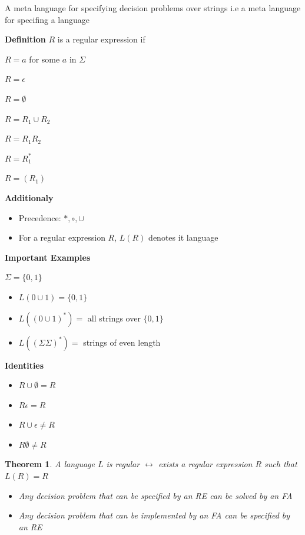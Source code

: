 \documentclass[oneside, 12pt]{book}
\newtheorem{theorem}{Theorem}
\begin{document}
A meta language for specifying decision problems over strings
i.e a meta language for specifing a language

\textbf{Definition} $R$ is a regular expression if

$R = a$ for some $a$ in $\Sigma$

$R=\epsilon$

$R=\emptyset$

$R = R_{1}\cup R_{2}$

$R = R_{1}R_{2}$

$R = R_{1}^{*}$

$R = (R_{1})$

\textbf{Additionaly}
\begin{itemize}
  \item Precedence: $*, \circ, \cup$
  \item For a regular expression $R$, $L(R)$ denotes it language
\end{itemize}

\textbf{Important Examples}

$\Sigma = \{0,1\}$

\begin{itemize}
  \item $L(0\cup 1) = \{0,1\}$
  \item $L((0\cup 1)^{*}) =$ all strings over $\{0,1\}$
        \item $L((\Sigma \Sigma)^{*})=$ strings of even length
\end{itemize}


\textbf{Identities}

\begin{itemize}
  \item $R\cup \emptyset = R$
  \item $R\epsilon = R$
  \item $R\cup \epsilon \neq R$
  \item $R\emptyset \neq R$
\end{itemize}

\begin{theorem}
  A language $L$ is regular $\leftrightarrow$ exists a regular expression $R$ such that $L(R) = R$
  \begin{itemize}
    \item Any decision problem that can be specified by an RE can be solved by an FA
    \item Any decision problem that can be implemented by an FA can be specified by an RE
  \end{itemize}
\end{theorem}
\end{document}
